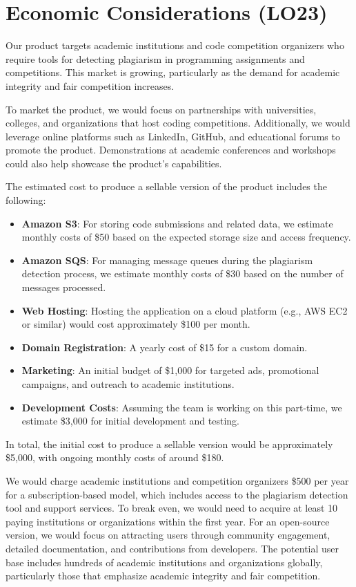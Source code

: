 \documentclass{article}
\begin{document}
\section{Economic Considerations (LO23)}

Our product targets academic institutions and code competition organizers who require tools for detecting plagiarism in programming assignments and competitions. This market is growing, particularly as the demand for academic integrity and fair competition increases.

To market the product, we would focus on partnerships with universities, colleges, and organizations that host coding competitions. Additionally, we would leverage online platforms such as LinkedIn, GitHub, and educational forums to promote the product. Demonstrations at academic conferences and workshops could also help showcase the product's capabilities.

The estimated cost to produce a sellable version of the product includes the following:

\begin{itemize}
    \item \textbf{Amazon S3}: For storing code submissions and related data, we estimate monthly costs of \$50 based on the expected storage size and access frequency.
    \item \textbf{Amazon SQS}: For managing message queues during the plagiarism detection process, we estimate monthly costs of \$30 based on the number of messages processed.
    \item \textbf{Web Hosting}: Hosting the application on a cloud platform (e.g., AWS EC2 or similar) would cost approximately \$100 per month.
    \item \textbf{Domain Registration}: A yearly cost of \$15 for a custom domain.
    \item \textbf{Marketing}: An initial budget of \$1,000 for targeted ads, promotional campaigns, and outreach to academic institutions.
    \item \textbf{Development Costs}: Assuming the team is working on this part-time, we estimate \$3,000 for initial development and testing.
\end{itemize}

In total, the initial cost to produce a sellable version would be approximately \$5,000, with ongoing monthly costs of around \$180.

We would charge academic institutions and competition organizers \$500 per year for a subscription-based model, which includes access to the plagiarism detection tool and support services. To break even, we would need to acquire at least 10 paying institutions or organizations within the first year. For an open-source version, we would focus on attracting users through community engagement, detailed documentation, and contributions from developers. The potential user base includes hundreds of academic institutions and organizations globally, particularly those that emphasize academic integrity and fair competition.
\end{document}
